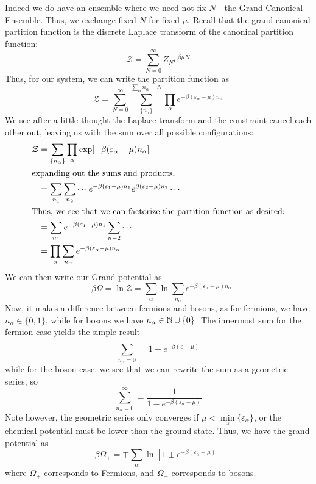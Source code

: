 Indeed we do have an ensemble where we need not fix \(N\)---the Grand Canonical Ensemble. Thus, we exchange fixed \(N\) for fixed \(\mu\). Recall that the grand canonical partition function is the discrete Laplace transform of the canonical partition function:
\[\mathcal Z = \sum_{N=0}^\infty Z_Ne^{\beta\mu N}\]
Thus, for our system, we can write the partition function as
\[\mathcal Z = \sum_{N=0}^\infty\sum_{\{n_\alpha\}}^{\sum_\alpha n_\alpha=N}\prod_\alpha e^{-\beta(\varepsilon_\alpha-\mu)n_\alpha}\]
We see after a little thought the Laplace transform and the constraint cancel each other out, leaving us with the sum over all possible configurations:
\begin{align}
	\mathcal Z &= \sum_{\{n_\alpha\}} \prod_\alpha \exp[-\beta(\varepsilon_\alpha-\mu)n_\alpha]\\
	\intertext{expanding out the sums and products,}
		   &=\sum_{n_1}\sum_{n_2}\cdots e^{-\beta(\varepsilon_1-\mu)n_1}e^{\beta(\varepsilon_2-\mu)n_2}\cdots\nonumber\\
		   \intertext{Thus, we see that we can factorize the partition function as desired:}
		   &=\sum_{n_1}e^{-\beta(\varepsilon_1-\mu)n_1}\sum_{n-2}\cdots\nonumber\\
		   &=\prod_\alpha\sum_{n_\alpha}e^{-\beta(\varepsilon_\alpha-\mu)n_\alpha}
\end{align}
We can then write our Grand potential as
\[-\beta \Omega = \ln \mathcal Z = \sum_\alpha \ln\sum_{n_\alpha}e^{-\beta(\varepsilon_\alpha-\mu)n_\alpha}\]
Now, it makes a difference between fermions and bosons, as for fermions, we have \(n_\alpha\in\{0,1\}\), while for bosons we have \(n_\alpha\in\mathbb{N}\cup\{0\}\). The innermost sum for the fermion case yields the simple result
\[\sum_{n_\alpha=0}^1 = 1+e^{-\beta(\varepsilon-\mu)}\]
while for the boson case, we see that we can rewrite the sum as a geometric series, so
\[\sum_{n_\alpha=0}^\infty = \frac{1}{1-e^{-\beta(\varepsilon_\alpha-\mu)}}\]
Note however, the geometric series only converges if \(\mu<\min\limits_\alpha\{\varepsilon_\alpha\}\), or the chemical potential must be lower than the ground state. Thus, we have the grand potential as
\begin{equation}
	\beta\Omega_\pm = \mp \sum_\alpha\ln\left[1\pm e^{-\beta(\varepsilon_\alpha-\mu)}\right]
\end{equation}
where \(\Omega_+\) corresponds to Fermions, and \(\Omega_-\) corresponds to bosons.

